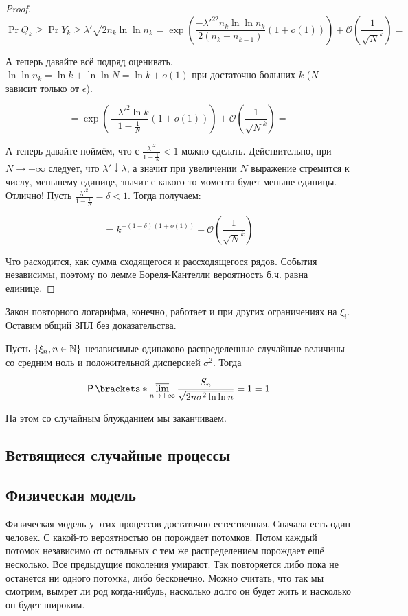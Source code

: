\begin{proof}
  \[
    \Pr{Q_k} \geq \Pr{Y_k \geq \lambda'\sqrt{2n_k\ln\ln n_k}} = 
    \exp\left(\frac{-\lambda'^22n_k\ln\ln n_k}{2(n_k - n_{k - 1})}(1 + o(1))\right) +
    \mathcal{O}\left(\frac{1}{\sqrt{N}^k}\right) =
  \]

  А теперь давайте всё подряд оценивать. $\ln\ln n_k = \ln k + \ln\ln N = \ln k + o(1)$
  при достаточно больших $k$ ($N$ зависит только от $\epsilon$).

  \[
    = \exp\left(\frac{-\lambda'^2\ln k}{1 - \frac{1}{N}}(1 + o(1))\right) + 
    \mathcal{O}\left(\frac{1}{\sqrt{N}^k}\right) =
  \]

  А теперь давайте поймём, что с $\frac{\lambda'^2}{1 - \frac{1}{N}} < 1$ можно
  сделать. Действительно, при $N \to +\infty$ следует, что $\lambda' \downarrow \lambda$,
  а значит при увеличении $N$ выражение стремится к числу, меньшему единице, значит
  с какого-то момента будет меньше единицы. Отлично! Пусть  $\frac{\lambda'^2}{1 - \frac{1}{N}} =
  \delta < 1$. Тогда получаем:

  \[
    = k^{-(1 - \delta)(1 + o(1))} +\mathcal{O}\left(\frac{1}{\sqrt{N}^k}\right)
  \]

  Что расходится, как сумма сходящегося и рассходящегося рядов. События независимы,
  поэтому по лемме Бореля-Кантелли вероятность б.ч. равна единице.
\end{proof}

Закон повторного логарифма, конечно, работает и при других ограничениях на $\xi_i$.
Оставим общий ЗПЛ
без доказательства.

\begin{theorem}
  Пусть $\{\xi_n, n \in \mathbb{N}\}$ независимые одинаково распределенные случайные
  величины со средним ноль и положительной дисперсией $\sigma^2$. Тогда

  \[
    \Pr{ \varlimsup\limits_{n \to +\infty} \frac{S_n}{\sqrt{2n\sigma^2\ln\ln n}} = 1} = 1 
  \]
\end{theorem}

На этом со случайным блужданием мы заканчиваем.

\subsection{Ветвящиеся случайные процессы}

\subsection{Физическая модель}

Физическая модель у этих процессов достаточно естественная. Сначала есть
один человек. С какой-то вероятностью он порождает потомков. Потом каждый потомок
независимо от остальных
с тем же распределением порождает ещё несколько. Все предыдущие поколения умирают.
Так повторяется либо пока не останется ни одного потомка, либо бесконечно.
Можно считать, что так мы смотрим, вымрет ли род когда-нибудь, насколько долго
он будет жить и насколько он будет широким.

